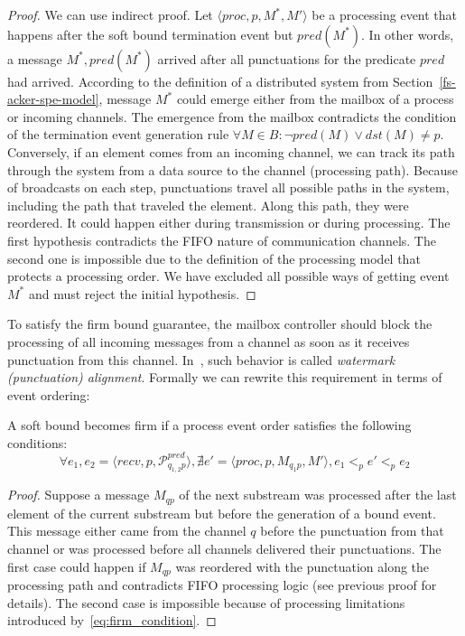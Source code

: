 \begin{proof}
We can use indirect proof. Let $\langle proc, p, M^*, M' \rangle$ be a processing event that happens after the soft bound termination event but $pred(M^*)$. In other words, a message $M^*, pred(M^*)$ arrived after all punctuations for the predicate $pred$ had arrived. According to the definition of a distributed system from Section~\ref{fs-acker-spe-model}, message $M^*$ could emerge either from the mailbox of a process or incoming channels. The emergence from the mailbox contradicts the condition of the termination event generation rule $\forall M\in B : \neg pred(M) \vee dst(M) \ne p$.
Conversely, if an element comes from an incoming channel, we can track its path through the system from a data source to the channel (processing path). Because of broadcasts on each step, punctuations travel all possible paths in the system, including the path that traveled the element. Along this path, they were reordered. It could happen either during transmission or during processing. The first hypothesis contradicts the FIFO nature of communication channels. The second one is impossible due to the definition of the processing model that protects a processing order. We have excluded all possible ways of getting event $M^*$ and must reject the initial hypothesis.
\end{proof}

To satisfy the firm bound guarantee, the mailbox controller should block the processing of all incoming messages from a channel as soon as it receives punctuation from this channel. In~\cite{Carbone:2017:SMA:3137765.3137777}, such behavior is called {\em watermark (punctuation) alignment}. Formally we can rewrite this requirement in terms of event ordering:

\begin{lemma}
A soft bound becomes firm if a process event order satisfies the following conditions:
\begin{equation}
\label{eq:firm_condition}
\forall e_1, e_2 = \langle recv, p, \mathcal{P}^{pred}_{q_{1,2}p} \rangle, \nexists e' = \langle proc, p, M_{q_1p}, M' \rangle, e_1 <_p e' <_p e_2
\end{equation}
\end{lemma}
\begin{proof}
Suppose a message $M_{qp}$ of the next substream was processed after the last element of the current substream but before the generation of a bound event. This message either came from the channel $q$ before the punctuation from that channel or was processed before all channels delivered their punctuations. The first case could happen if $M_{qp}$ was reordered with the punctuation along the processing path and contradicts FIFO processing logic (see previous proof for details). The second case is impossible because of processing limitations introduced by~\ref{eq:firm_condition}.
\end{proof}


